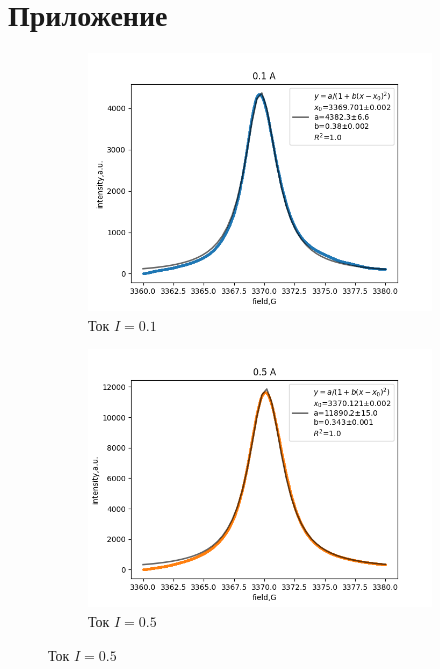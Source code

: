 \documentclass{article}
\begin{document}
\newpage
\section*{Приложение} \label{prilosh}

\begin{figure}[h!]
  \centering
  \begin{subfigure}[b]{0.3\linewidth}
    \includegraphics[width=\linewidth]{1/11.png}
    \caption{Ток $I = 0.1$}
  \end{subfigure}
  \begin{subfigure}[b]{0.3\linewidth}
    \includegraphics[width=\linewidth]{1/12.png}
    \caption{Ток $I = 0.5$}
  \end{subfigure}

\end{figure}
\end{document}
